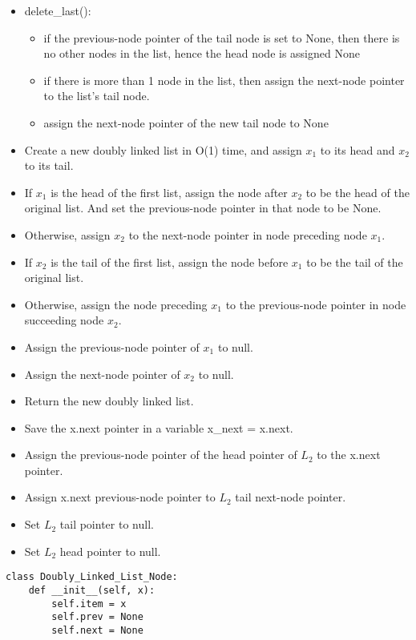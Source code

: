 \begin{problems}
\begin{problemparts}
\begin{itemize}
   	 \item delete\_last():
        \begin{itemize}
			\item if the previous-node pointer of the tail node is set to None, then there is no other nodes in the list, hence the head node is assigned None
			\item if there is more than 1 node in the list, then assign the next-node pointer to the list's tail node.
			\item assign the next-node pointer of the new tail node to None
        \end{itemize}

\end{itemize}

\newpage

\problempart %
\begin{itemize}
\item Create a new doubly linked list in O(1) time, and assign $x_1$ to its head and $x_2$ to its tail.
\item If $x_1$ is the head of the first list, assign the node after $x_2$ to be the head of the original list. And set the previous-node pointer in that node to be None.
\item Otherwise, assign $x_2$ to the next-node pointer in node preceding node $x_1$.
\item If $x_2$ is the tail of the first list, assign the node before $x_1$ to be the tail of the original list.
\item Otherwise, assign the node preceding $x_1$ to the previous-node pointer in node succeeding node $x_2$.
\item Assign the previous-node pointer of $x_1$ to null.
\item Assign the next-node pointer of $x_2$ to null.
\item Return the new doubly linked list.
\end{itemize}
\medskip
\problempart %

\begin{itemize}

\item Save the x.next pointer in a variable x\_next = x.next.
\item Assign the previous-node pointer of the head pointer of $L_2$ to the x.next pointer.
\item Assign x.next previous-node pointer to $L_2$ tail next-node pointer.
\item Set $L_2$ tail pointer to null.
\item Set $L_2$ head pointer to null.
\end{itemize}
\medskip
\problempart 
\begin{lstlisting}
class Doubly_Linked_List_Node:
    def __init__(self, x):
        self.item = x
        self.prev = None
        self.next = None


\end{lstlisting}
\end{problemparts}
\end{problems}
